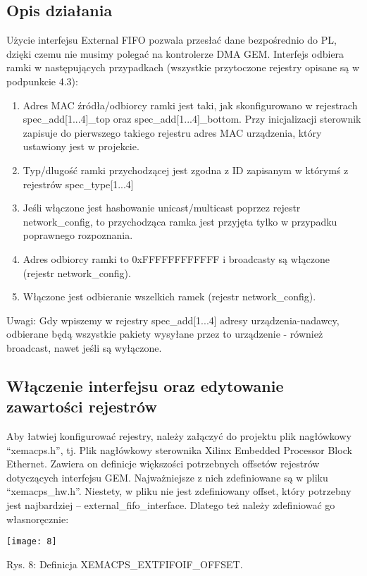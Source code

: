 \documentclass[11pt, letterpaper]{article}
\begin{document}
\subsection{Opis działania}
Użycie interfejsu External FIFO pozwala przesłać dane bezpośrednio do PL, dzięki czemu nie musimy polegać na kontrolerze DMA GEM.
Interfejs odbiera ramki w następujących przypadkach (wszystkie przytoczone rejestry opisane są w podpunkcie 4.3):
\begin{enumerate}
    \item Adres MAC źródła/odbiorcy ramki jest taki, jak skonfigurowano w rejestrach spec\_add[1...4]\_top oraz spec\_add[1...4]\_bottom. Przy inicjalizacji sterownik zapisuje do pierwszego takiego rejestru adres MAC urządzenia, który ustawiony jest w projekcie.
    \item Typ/dlugość ramki przychodzącej jest zgodna z ID zapisanym w którymś z rejestrów spec\_type[1...4]
    \item Jeśli włączone jest hashowanie unicast/multicast poprzez rejestr network\_config, to przychodząca ramka jest przyjęta tylko w przypadku poprawnego rozpoznania.
    \item Adres odbiorcy ramki to 0xFFFFFFFFFFFF i broadcasty są włączone (rejestr network\_config).
    \item Włączone jest odbieranie wszelkich ramek (rejestr network\_config).
\end{enumerate}

Uwagi:
Gdy wpiszemy w rejestry spec\_add[1...4] adresy urządzenia-nadawcy, odbierane będą wszystkie pakiety wysyłane przez to urządzenie - również broadcast, nawet jeśli są wyłączone.

\subsection{Włączenie interfejsu oraz edytowanie zawartości rejestrów}
Aby łatwiej konfigurować rejestry, należy załączyć do projektu plik nagłówkowy “xemacps.h”, tj. Plik nagłówkowy sterownika Xilinx Embedded Processor Block Ethernet. Zawiera on definicje większości potrzebnych offsetów rejestrów dotyczących interfejsu GEM. Najważniejsze z nich zdefiniowane są w pliku “xemacps\_hw.h”.
Niestety, w pliku nie jest zdefiniowany offset, który potrzebny jest najbardziej – external\_fifo\_interface. Dlatego też należy zdefiniować go własnoręcznie:

\vspace{5mm}
\texttt{[image: 8]}
\begin{center}
\caption{Rys. 8: Definicja XEMACPS\_EXTFIFOIF\_OFFSET.}
\end{center}
\end{document}
